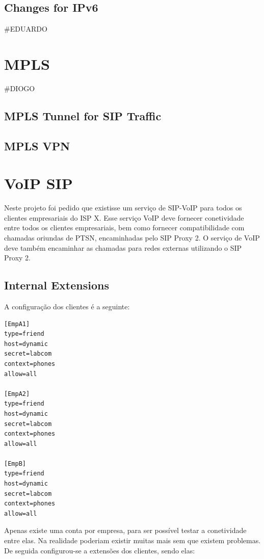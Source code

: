 \documentclass[11pt,a4paper]{report}
\begin{document}
\section{Changes for IPv6}
\#EDUARDO

\chapter{MPLS}
\#DIOGO
\section{MPLS Tunnel for SIP Traffic}
\section{MPLS VPN}


\chapter{VoIP SIP}

Neste projeto foi pedido que existisse um serviço de SIP-VoIP para todos os clientes empresariais do ISP X. Esse serviço VoIP deve fornecer conetividade entre todos os clientes empresariais, bem como fornecer compatibilidade com chamadas oriundas de PTSN, encaminhadas pelo SIP Proxy 2. O serviço de VoIP deve também encaminhar as chamadas para redes externas utilizando o SIP Proxy 2.

\section{Internal Extensions}

A configuração dos clientes é a seguinte:

\begin{lstlisting}[caption=SIP Proxy 1 - /etc/asterisk/sip.conf]
[EmpA1]
type=friend
host=dynamic
secret=labcom
context=phones
allow=all

[EmpA2]
type=friend
host=dynamic
secret=labcom
context=phones
allow=all

[EmpB]
type=friend
host=dynamic
secret=labcom
context=phones
allow=all
\end{lstlisting}

Apenas existe uma conta por empresa, para ser possível testar a conetividade entre elas. Na realidade poderiam existir muitas mais sem que existem problemas.\\

De seguida configurou-se a extensões dos clientes, sendo elas:
\end{document}
